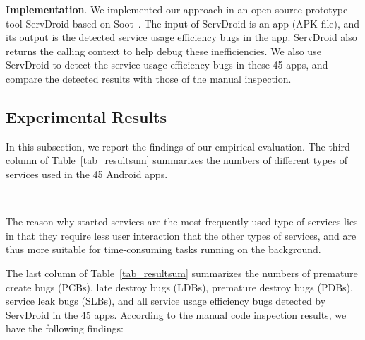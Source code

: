 \documentclass[conference]{IEEEtran}
\begin{document}
\textbf{Implementation}. We implemented our approach in an open-source prototype
tool {\sf ServDroid} based on {\sf Soot}~\cite{sootpaper}. The input of {\sf
ServDroid} is an app (APK file), and its output is the detected service usage
efficiency bugs in the app. {\sf ServDroid} also returns the calling context to
help debug these inefficiencies. We also use {\sf ServDroid} to
detect the service usage efficiency bugs in these 45 apps, and compare the
detected results with those of the manual inspection.

\subsection{Experimental Results}
In this subsection, we report the findings of our empirical
evaluation. The third column of Table~\ref{tab_resultsum} summarizes the numbers
of different types of services used in the 45 Android apps.

\medskip
{\setlength{\parindent}{0 em}
}\\
\medskip

The reason why started services are the most frequently used type of services
lies in that they require less user interaction that the other types of
services, and are thus more suitable for time-consuming tasks running on
the background.


The last column of Table~\ref{tab_resultsum}
summarizes the numbers of premature create bugs (PCBs), late destroy bugs
(LDBs), premature destroy bugs (PDBs), service leak bugs (SLBs), and all service usage
efficiency bugs detected by \textsf{ServDroid} in the 45 apps. According to the
manual code inspection results, we have the following findings:
\end{document}
